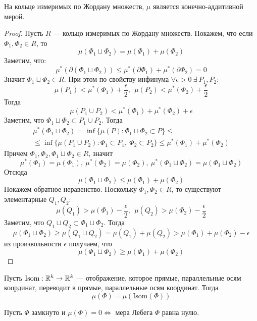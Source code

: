 \newpage
\begin{statement}
    На кольце измеримых по Жордану множеств, $\mu$ является конечно-аддитивной мерой.
\end{statement}
\begin{proof}
    Пусть $R$ --- кольцо измеримых по Жордану множеств. Покажем, что если $\Phi_1,\Phi_2\in R$, то
    \[\mu(\Phi_1\sqcup \Phi_2)=\mu(\Phi_1)+\mu(\Phi_2)\]
    Заметим, что:
    \[\mu^*(\partial(\Phi_1\sqcup \Phi_2))\leq \mu^*(\partial\Phi_1)+\mu^*(\partial\Phi_2)=0\]
    Значит $\Phi_1\sqcup\Phi_2\in R$.
    При этом по свойству инфинума $\forall \epsilon>0\ \exists\ P_{1},P_{2}$:
    \[\mu(P_1)<\mu^*(\Phi_1)+\frac{\epsilon}{2},\ \ \mu(P_2)<\mu^*(\Phi_2)+\frac{\epsilon}{2}\]
    Тогда
    \[\mu(P_1\cup P_2)<\mu^*(\Phi_1)+\mu^*(\Phi_2)+\epsilon\]
    Заметим, что $\Phi_1\sqcup\Phi_2\subset P_1\cup P_2$. Тогда
    \begin{multline*}
        \mu^*(\Phi_1\sqcup\Phi_2)=\inf\{\mu(P): \Phi_1\sqcup\Phi_2\subset P\}\leq \\
        \leq\inf\{\mu(P_1\cup P_2): \Phi_1\subset P_1,\ \Phi_2\subset P_2\}\leq \mu^*(\Phi_1)+\mu^*(\Phi_2)
    \end{multline*}
    Причем $\Phi_1,\Phi_2, \Phi_1\sqcup\Phi_2\in R$, значит
    \[\mu^*(\Phi_1)=\mu(\Phi_1),\ \mu^*(\Phi_2)=\mu(\Phi_2),\ \mu^*(\Phi_1\sqcup\Phi_2)=\mu(\Phi_1\sqcup\Phi_2)\]
    Отсюда 
    \[\mu(\Phi_1\sqcup\Phi_2)\leq \mu(\Phi_1)+\mu(\Phi_2)\]
    Покажем обратное неравенство. Поскольку $\Phi_1,\Phi_2\in R$, то существуют элементарные $Q_1,Q_2$:
    \[\mu(Q_1)>\mu(\Phi_1)-\frac{\epsilon}{2},\ \ \mu(Q_2)>\mu(\Phi_2)-\frac{\epsilon}{2}\]
    Заметим, что $Q_1\sqcup Q_2\subset \Phi_1\sqcup\Phi_2$. Тогда
    \[\mu(\Phi_1\sqcup\Phi_2)\geq \mu(Q_1\sqcup Q_2)=\mu(Q_1)+\mu(Q_2)>\mu(\Phi_1)+\mu(\Phi_2)-\epsilon\]
    из произвольности $\epsilon$ получаем, что
    \[\mu(\Phi_1\sqcup\Phi_2)\geq \mu(\Phi_1)+\mu(\Phi_2)\]
\end{proof}
\begin{statement}
    Пусть $\text{Isom}: \mathbb{R}^k\to \mathbb{R}^k$ --- отображение, которое прямые, параллельные осям координат, переводит в прямые, параллельные осям координат. Тогда
    \[\mu(\Phi)=\mu(\text{Isom}(\Phi))\]
\end{statement}
\begin{statement}
    Пусть $\Phi$ замкнуто и $\mu(\Phi)=0 \Leftrightarrow$ мера Лебега $\Phi$ равна нулю.
\end{statement}
\newpage